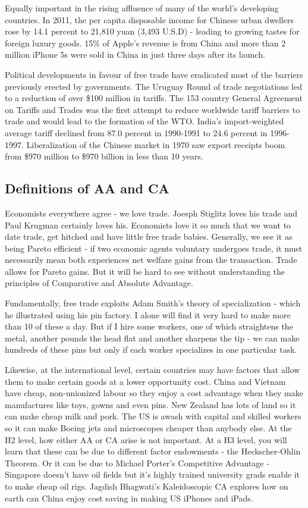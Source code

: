 Equally important in the rising affluence of many of the world's developing countries. In 2011, the per capita disposable income for Chinese urban dwellers rose by 14.1 percent to 21,810 yuan (3,493 U.S.D) - leading to growing tastes for foreign luxury goods. 15\% of Apple's revenue is from China and more than 2 million iPhone 5s were sold in China in just three days after its launch.

Political developments in favour of free trade have eradicated most of the barriers previously erected by governments. The Uruguay Round of trade negotiations led to a reduction of over \$100 million in tariffs. The 153 country General Agreement on Tariffs and Trades was the first attempt to reduce worldwide tariff barriers to trade and would lead to the formation of the WTO. India's import-weighted average tariff declined from 87.0 percent in 1990-1991 to 24.6 percent in 1996-1997. Liberalization of the Chinese market in 1970 saw export receipts boom from \$970 million to \$970 billion in less than 10 years.
\subsection{Definitions of AA and CA}
Economists everywhere agree - we love trade. Joesph Stiglitz loves his trade and Paul Krugman certainly loves his. Economists love it so much that we want to date trade, get hitched and have little free trade babies. Generally, we see it as being Pareto efficient - if two economic agents voluntary undergoes trade, it must necessarily mean both experiences net welfare gains from the transaction. Trade allows for Pareto gains. But it will be hard to see without understanding the principles of Comparative and Absolute Advantage.

Fundamentally, free trade exploits Adam Smith's theory of specialization - which he illustrated using his pin factory. I alone will find it very hard to make more than 10 of these a day. But if I hire some workers, one of which straightens the metal, another pounds the head flat and another sharpens the tip - we can make hundreds of these pins but only if each worker specializes in one particular task.

Likewise, at the international level, certain countries may have factors that allow them to make certain goods at a lower opportunity cost. China and Vietnam have cheap, non-unionized labour so they enjoy a cost advantage when they make manufactures like toys, gowns and even pins. New Zealand has lots of land so it can make cheap milk and pork. The US is awash with capital and skilled workers so it can make Boeing jets and microscopes cheaper than anybody else. At the H2 level, how either AA or CA arise is not important. At a H3 level, you will learn that these can be due to different factor endowments - the Heckscher-Ohlin Theorem. Or it can be due to Michael Porter's Competitive Advantage - Singapore doesn't have oil fields but it's highly trained university grads enable it to make cheap oil rigs. Jagdish Bhagwati's Kaleidoscopic CA explores how on earth can China enjoy cost saving in making US iPhones and iPads.
